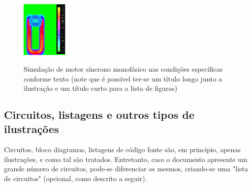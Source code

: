 \documentclass[repeatfields,xlists,xpacks,oneside,yearsonly]{ufrgscca}
\begin{document}
\begin{appendix}
\begin{figure}[htbp]
{
  \centering
  \caption[Simulação de motor síncrono monofásico.]{Simulação de motor síncrono monofásico nas condições específicas conforme texto (note que é possível ter-se um título longo junto a ilustração e um título curto para a lista de figuras)}
  \includegraphics[width=0.2\textwidth]{motor}\\
}
{}
\end{figure}


\subsection{Circuitos, listagens  e outros tipos de ilustrações}

Circuitos, bloco diagramas, listagens de código fonte são, em princípio, apenas ilustrações, e como tal são tratados. Entretanto, caso o documento apresente um grande número de circuitos, pode-se diferenciar os mesmos, criando-se uma "lista de circuitos" (opcional, como descrito a seguir).


\end{appendix}
\end{document}
